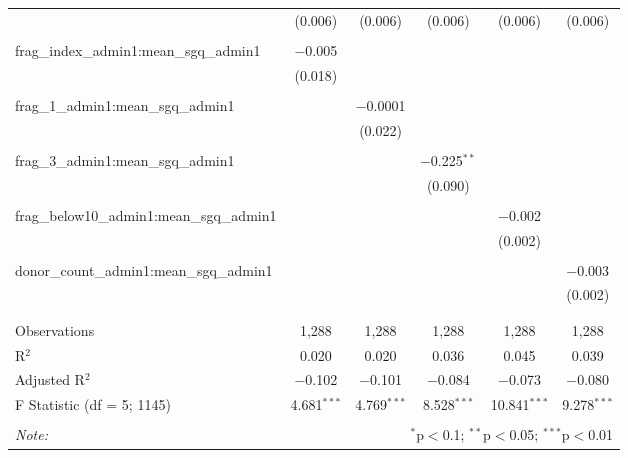 \begin{table}[!htbp]
\begin{tabular}{@{\extracolsep{5pt}}lccccc}
  & (0.006) & (0.006) & (0.006) & (0.006) & (0.006) \\ 
  & & & & & \\ 
 frag\_index\_admin1:mean\_sgq\_admin1 & $-$0.005 &  &  &  &  \\ 
  & (0.018) &  &  &  &  \\ 
  & & & & & \\ 
 frag\_1\_admin1:mean\_sgq\_admin1 &  & $-$0.0001 &  &  &  \\ 
  &  & (0.022) &  &  &  \\ 
  & & & & & \\ 
 frag\_3\_admin1:mean\_sgq\_admin1 &  &  & $-$0.225$^{**}$ &  &  \\ 
  &  &  & (0.090) &  &  \\ 
  & & & & & \\ 
 frag\_below10\_admin1:mean\_sgq\_admin1 &  &  &  & $-$0.002 &  \\ 
  &  &  &  & (0.002) &  \\ 
  & & & & & \\ 
 donor\_count\_admin1:mean\_sgq\_admin1 &  &  &  &  & $-$0.003 \\ 
  &  &  &  &  & (0.002) \\ 
  & & & & & \\ 
\hline \\[-1.8ex] 
Observations & 1,288 & 1,288 & 1,288 & 1,288 & 1,288 \\ 
R$^{2}$ & 0.020 & 0.020 & 0.036 & 0.045 & 0.039 \\ 
Adjusted R$^{2}$ & $-$0.102 & $-$0.101 & $-$0.084 & $-$0.073 & $-$0.080 \\ 
F Statistic (df = 5; 1145) & 4.681$^{***}$ & 4.769$^{***}$ & 8.528$^{***}$ & 10.841$^{***}$ & 9.278$^{***}$ \\ 
\hline 
\hline \\[-1.8ex] 
\textit{Note:}  & \multicolumn{5}{r}{$^{*}$p$<$0.1; $^{**}$p$<$0.05; $^{***}$p$<$0.01} \\ 
\end{tabular} 
\end{table} 
